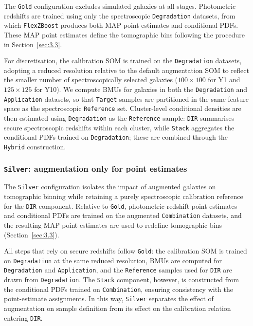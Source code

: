 The \texttt{Gold} configuration excludes simulated galaxies at all stages. Photometric redshifts are trained using only the spectroscopic \texttt{Degradation} datasets, from which \texttt{FlexZBoost} produces both MAP point estimates and conditional PDFs. These MAP point estimates define the tomographic bins following the procedure in Section~\ref{sec:3.3}.

For discretisation, the calibration SOM is trained on the \texttt{Degradation} datasets, adopting a reduced resolution relative to the default augmentation SOM to reflect the smaller number of spectroscopically selected galaxies (\(100 \times 100\) for Y1 and \(125 \times 125\) for Y10). We compute BMUs for galaxies in both the \texttt{Degradation} and \texttt{Application} datasets, so that \texttt{Target} samples are partitioned in the same feature space as the spectroscopic \texttt{Reference} set. Cluster-level conditional densities are then estimated using \texttt{Degradation} as the \texttt{Reference} sample: \texttt{DIR} summarises secure spectroscopic redshifts within each cluster, while \texttt{Stack} aggregates the conditional PDFs trained on \texttt{Degradation}; these are combined through the \texttt{Hybrid} construction.

\subsubsection{\texttt{Silver}: augmentation only for point estimates} \label{sec:3.4.2}

The \texttt{Silver} configuration isolates the impact of augmented galaxies on tomographic binning while retaining a purely spectroscopic calibration reference for the \texttt{DIR} component. Relative to \texttt{Gold}, photometric-redshift point estimates and conditional PDFs are trained on the augmented \texttt{Combination} datasets, and the resulting MAP point estimates are used to redefine tomographic bins (Section~\ref{sec:3.3}).

All steps that rely on secure redshifts follow \texttt{Gold}: the calibration SOM is trained on \texttt{Degradation} at the same reduced resolution, BMUs are computed for \texttt{Degradation} and \texttt{Application}, and the \texttt{Reference} samples used for \texttt{DIR} are drawn from \texttt{Degradation}. The \texttt{Stack} component, however, is constructed from the conditional PDFs trained on \texttt{Combination}, ensuring consistency with the point-estimate assignments. In this way, \texttt{Silver} separates the effect of augmentation on sample definition from its effect on the calibration relation entering \texttt{DIR}.


